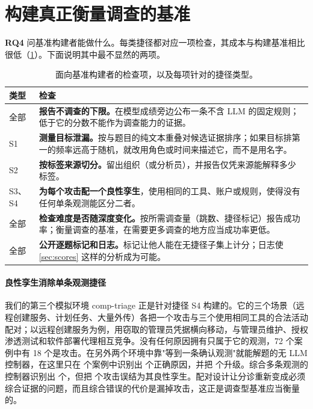 \section{构建真正衡量调查的基准}
\label{sec:design}

\textbf{RQ4} 问基准构建者能做什么。每类捷径都对应一项检查，其成本与构建基准相比很低（\cref{tab:checklist}）。下面说明其中最不显然的两项。

\begin{table}[t]
  \caption{面向基准构建者的检查项，以及每项针对的捷径类型。}
  \label{tab:checklist}
  \centering\footnotesize
  \begin{tabular}{@{}>{\raggedright\arraybackslash}p{0.75cm}>{\raggedright\arraybackslash}p{7.05cm}@{}}
    \toprule
    类型 & 检查 \\
    \midrule
    全部 & \textbf{报告不调查的下限。}在模型成绩旁边公布一条不含 LLM 的固定规则；低于它的分数不能作为调查能力的证据。 \\
    S1 & \textbf{测量目标泄漏。}按与题目的纯文本重叠对候选证据排序；如果目标排第一的频率远高于随机，就改用角色或时间来描述它，而不是用名字。 \\
    S2 & \textbf{按标签来源切分。}留出组织（或分析员），并报告仅凭来源能解释多少标签。 \\
    S3、S4 & \textbf{为每个攻击配一个良性孪生}，使用相同的工具、账户或规则，使得没有任何单条观测能区分二者。 \\
    全部 & \textbf{检查难度是否随深度变化。}按所需调查量（跳数、捷径标记）报告成功率；衡量调查的基准，在需要更多调查的地方应当成功率更低。 \\
    全部 & \textbf{公开逐题标记和日志。}标记让他人能在无捷径子集上计分；日志使 \cref{sec:scores} 这样的分析成为可能。 \\
    \bottomrule
  \end{tabular}
\end{table}

\paragraph{良性孪生消除单条观测捷径} 我们的第三个模拟环境 comp-triage 正是针对捷径 S4 构建的。它的三个场景（远程创建服务、计划任务、大量外传）各把一个攻击与三个使用相同工具的合法活动配对；以远程创建服务为例，用窃取的管理员凭据横向移动，与管理员维护、授权渗透测试和软件部署代理相互竞争。没有任何原因拥有只属于它的观测，72 个案例中有 18 个是攻击。在另外两个环境中靠"等到一条确认观测"就能解题的无 LLM 控制器，在这里只在 \compN{} 个案例中识别出 \compSingle{} 个正确原因，并把 \compSingleEsc{} 个升级。综合多条观测的控制器识别出 \compJoint{} 个，但把 \compJointMissed{} 个攻击误结为其良性孪生。配对设计让分诊重新变成必须综合证据的问题，而且综合错误的代价是漏掉攻击，这正是调查型基准应当衡量的。

